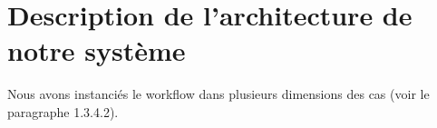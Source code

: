     \section{Description de l'architecture de notre système}
    
Nous avons instanciés le workflow dans plusieurs dimensions des cas (voir le paragraphe 1.3.4.2).         
 
